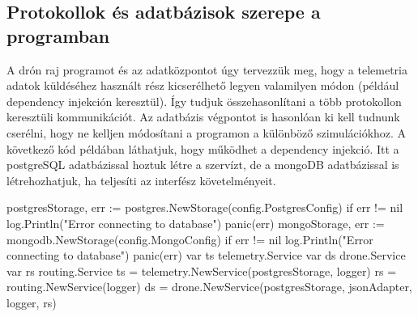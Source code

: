 \subsection{Protokollok és adatbázisok szerepe a programban}
A drón raj programot és az adatközpontot úgy tervezzük meg, hogy a telemetria adatok küldéséhez használt rész kicserélhető legyen valamilyen módon (például dependency injekción keresztül).
Így tudjuk összehasonlítani a több protokollon keresztüli kommunikációt. Az adatbázis végpontot is hasonlóan ki kell tudnunk cserélni, hogy ne kelljen módosítani a programon a különböző szimulációkhoz.
A következő kód példában láthatjuk, hogy működhet a dependency injekció. Itt a postgreSQL adatbázissal hoztuk létre a szervízt, de a mongoDB adatbázissal is létrehozhatjuk, ha teljesíti az interfész követelményeit.
\begin{python}
    postgresStorage, err := postgres.NewStorage(config.PostgresConfig)
    if err != nil {
        log.Println("Error connecting to database")
        panic(err)
    }
    mongoStorage, err := mongodb.NewStorage(config.MongoConfig)
    if err != nil {
        log.Println("Error connecting to database")
        panic(err)
    }
    var ts telemetry.Service
    var ds drone.Service
    var rs routing.Service
    ts = telemetry.NewService(postgresStorage, logger)
    rs = routing.NewService(logger)
    ds = drone.NewService(postgresStorage, jsonAdapter, logger, rs)
\end{python}




